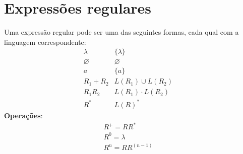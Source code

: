 \documentclass[11pt]{article}
\begin{document}
\section{Expressões regulares}
\label{sec:orgb352b86}
Uma expressão regular pode ser uma das seguintes formas, cada qual com a linguagem
correspondente:
\begin{align*}
  & \lambda & \{\lambda\} && \\
  & \varnothing & \varnothing && \\
  & a & \{a\} && \\
  & R_1 + R_2 & L(R_1) \cup L(R_2)  && \\
  & R_1 R_2 & L(R_1) \cdot L(R_2)  && \\
  & R^* & L(R)^* 
\end{align*}
\textbf{Operações}:
\begin{align*}
  & R^+ = RR^* && \\
  & R^0 = \lambda && \\
  & R^n = RR^{(n - 1)} &&
\end{align*}
\end{document}
